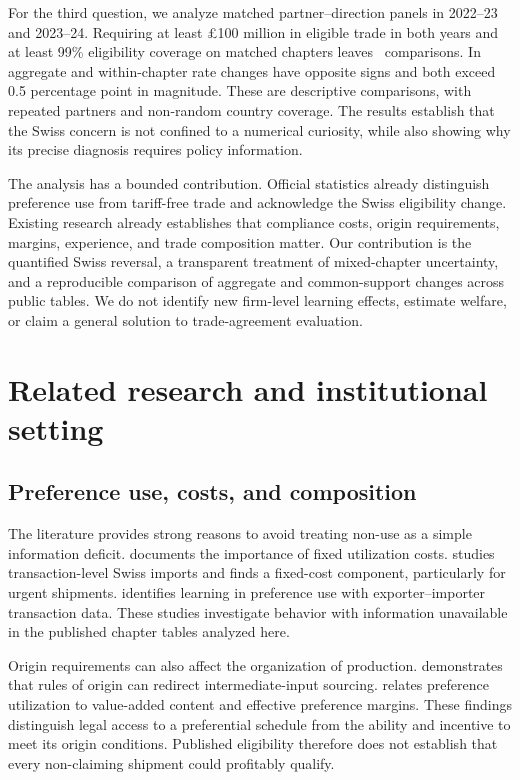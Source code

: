 \documentclass[11pt,a4paper]{article}
\begin{document}
For the third question, we analyze matched partner--direction panels in 2022--23 and 2023--24. Requiring at least \pounds100 million in eligible trade in both years and at least 99\% eligibility coverage on matched chapters leaves \PanelCount\ comparisons. In \ReversalCount\, aggregate and within-chapter rate changes have opposite signs and both exceed 0.5 percentage point in magnitude. These are descriptive comparisons, with repeated partners and non-random country coverage. The results establish that the Swiss concern is not confined to a numerical curiosity, while also showing why its precise diagnosis requires policy information.

The analysis has a bounded contribution. Official statistics already distinguish preference use from tariff-free trade and acknowledge the Swiss eligibility change. Existing research already establishes that compliance costs, origin requirements, margins, experience, and trade composition matter. Our contribution is the quantified Swiss reversal, a transparent treatment of mixed-chapter uncertainty, and a reproducible comparison of aggregate and common-support changes across public tables. We do not identify new firm-level learning effects, estimate welfare, or claim a general solution to trade-agreement evaluation.

\section{Related research and institutional setting}
\subsection{Preference use, costs, and composition}
The literature provides strong reasons to avoid treating non-use as a simple information deficit. \citet{keck2012} documents the importance of fixed utilization costs. \citet{legge2024} studies transaction-level Swiss imports and finds a fixed-cost component, particularly for urgent shipments. \citet{krishna2025} identifies learning in preference use with exporter--importer transaction data. These studies investigate behavior with information unavailable in the published chapter tables analyzed here.

Origin requirements can also affect the organization of production. \citet{conconi2018} demonstrates that rules of origin can redirect intermediate-input sourcing. \citet{cariola2022} relates preference utilization to value-added content and effective preference margins. These findings distinguish legal access to a preferential schedule from the ability and incentive to meet its origin conditions. Published eligibility therefore does not establish that every non-claiming shipment could profitably qualify.
\end{document}
